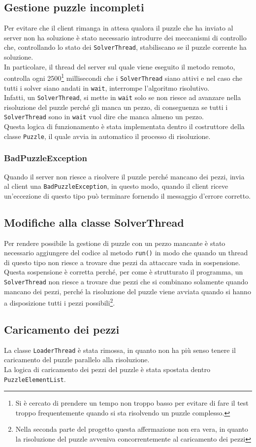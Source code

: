 \documentclass[a4paper, 12pt]{article}
\begin{document}
\subsection{Gestione puzzle incompleti}\label{badpuzzle}
Per evitare che il client rimanga in attesa qualora il puzzle che ha inviato al server non ha soluzione è stato necessario introdurre dei meccanismi di controllo che, controllando lo stato dei \texttt{SolverThread}, stabiliscano se il puzzle corrente ha soluzione. \\
In particolare, il thread del server sul quale viene eseguito il metodo remoto, controlla ogni 2500\footnote{Si è cercato di prendere un tempo non troppo basso per evitare di fare il test troppo frequentemente quando si sta risolvendo un puzzle complesso.} millisecondi che i \texttt{SolverThread} siano attivi e nel caso che tutti i solver siano andati in \texttt{wait}, interrompe l'algoritmo risolutivo. \\
Infatti, un \texttt{SolverThread}, si mette in \texttt{wait} solo se non riesce ad avanzare nella risoluzione del puzzle perché gli manca un pezzo, di conseguenza se tutti i \texttt{SolverThread} sono in \texttt{wait} vuol dire che manca almeno un pezzo. \\
Questa logica di funzionamento è stata implementata dentro il costruttore della classe \texttt{Puzzle}, il quale avvia in automatico il processo di risoluzione.

\subsubsection{BadPuzzleException}
Quando il server non riesce a risolvere il puzzle perché mancano dei pezzi, invia al client una \texttt{BadPuzzleException}, in questo modo, quando il client riceve un'eccezione di questo tipo può terminare fornendo il messaggio d'errore corretto.

\subsection{Modifiche alla classe SolverThread}
Per rendere possibile la gestione di puzzle con un pezzo mancante è stato necessario aggiungere del codice al metodo \texttt{run()} in modo che quando un thread di questo tipo non riesce a trovare due pezzi da attaccare vada in sospensione. \\
Questa sospensione è corretta perché, per come è strutturato il programma, un \texttt{SolverThread} non riesce a trovare due pezzi che si combinano solamente quando mancano dei pezzi, perché la risoluzione del puzzle viene avviata quando si hanno a disposizione tutti i pezzi possibili\footnote{Nella seconda parte del progetto questa affermazione non era vera, in quanto la risoluzione del puzzle avveniva concorrentemente al caricamento dei pezzi}.

\subsection{Caricamento dei pezzi}
La classe \texttt{LoaderThread} è stata rimossa, in quanto non ha più senso tenere il caricamento del puzzle parallelo alla risoluzione. \\
La logica di caricamento dei pezzi del puzzle è stata spostata dentro \texttt{PuzzleElementList}.
\end{document}
